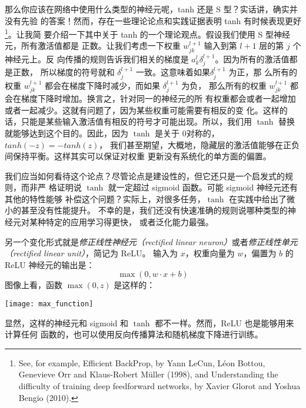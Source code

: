 那么你应该在网络中使用什么类型的神经元呢，tanh 还是 S 型？实话讲，确实并没有先验
的答案！然而，存在一些理论论点和实践证据表明 tanh 有时候表现更好\footnote{See,
  for example, Efficient BackProp, by Yann LeCun, Léon Bottou, Genevieve Orr
  and Klaus-Robert Müller (1998), and Understanding the difficulty of training
  deep feedforward networks, by Xavier Glorot and Yoshua Bengio (2010).}。让我简
要介绍一下其中关于 tanh 的一个理论观点。假设我们使用 S 型神经元，所有激活值都是
正数。让我们考虑一下权重 $w_{jk}^{l+1}$ 输入到第 $l+1$ 层的第 $j$ 个神经元上。反
向传播的规则告诉我们相关的梯度是 $a_k^l\delta_j^{l+1}$。因为所有的激活值都是正数，
所以梯度的符号就和 $\delta_j^{l+1}$ 一致。这意味着如果$\delta_j^{l+1}$ 为正，那
么所有的权重 $w_{jk}^{l+1}$ 都会在梯度下降时减少，而如果 $\delta_j^{l+1}$ 为负，
那么所有的权重 $w_{jk}^{l+1}$ 都会在梯度下降时增加。换言之，针对同一的神经元的所
有权重都会或者一起增加或者一起减少。这就有问题了，因为某些权重可能需要有相反的变
化。这样的话，只能是某些输入激活值有相反的符号才可能出现。所以，我们用 $\tanh$
替换就能够达到这个目的。因此，因为 $\tanh$ 是关于 $0$对称的，$tanh(-z)=-tanh(z)$，
我们甚至期望，大概地，隐藏层的激活值能够在正负间保持平衡。这样其实可以保证对权重
更新没有系统化的单方面的偏置。

我们应当如何看待这个论点？尽管论点是建设性的，但它还只是一个启发式的规则，而非严
格证明说 $\tanh$ 就一定超过 sigmoid 函数。可能 sigmoid 神经元还有其他的特性能够
补偿这个问题？实际上，对很多任务，$\tanh$ 在实践中给出了微小的甚至没有性能提升。
不幸的是，我们还没有快速准确的规则说哪种类型的神经元对某种特定的应用学习得更快，
或者泛化能力最强。

另一个变化形式就是\emph{修正线性神经元（rectified linear
    neuron）}或者\emph{修正线性单元（rectified linear unit）}，简记为 ReLU。
输入为 $x$，权重向量为 $w$，偏置为 $b$ 的 ReLU 神经元的输出是：
\begin{equation}
  \max(0, w \cdot x+b)
  \label{eq:112}\tag{112}
\end{equation}
图像上看，函数 $\max(0,z)$ 是这样的：
\begin{center}
  \texttt{[image: max\_function]}
\end{center}

显然，这样的神经元和 sigmoid 和 $\tanh$ 都不一样。然而，ReLU 也是能够用来计算任何
函数的，也可以使用反向传播算法和随机梯度下降进行训练。


